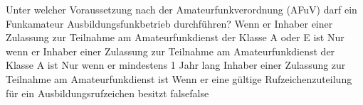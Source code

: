     {Unter welcher Voraussetzung nach der Amateurfunkverordnung (AFuV) darf ein Funkamateur Ausbildungsfunkbetrieb durchführen?}
    {Wenn er Inhaber einer Zulassung zur Teilnahme am Amateurfunkdienst der Klasse A oder E ist}
    {Nur wenn er Inhaber einer Zulassung zur Teilnahme am Amateurfunkdienst der Klasse A ist}
    {Nur wenn er mindestens 1 Jahr lang Inhaber einer Zulassung zur Teilnahme am Amateurfunkdienst ist}
    {Wenn er eine gültige Rufzeichenzuteilung für ein Ausbildungsrufzeichen besitzt}
    {false}{false}